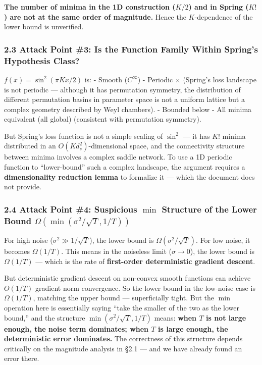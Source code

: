 \documentclass[
  12pt,
]{article}
\begin{document}
\textbf{The number of minima in the 1D construction ($K/2$) and in Spring ($K!$) are not at the same order of magnitude.} Hence the $K$-dependence of the lower bound is unverified.

\subsubsection{2.3 Attack Point \#3: Is the Function Family Within Spring's Hypothesis Class?}\label{attack-3-function-family}

$f(x) = \sin^2(\pi K x / 2)$ is:
- Smooth ($C^\infty$) \checkmark
- Periodic $\times$ (Spring's loss landscape is not periodic --- although it has permutation symmetry, the distribution of different permutation basins in parameter space is not a uniform lattice but a complex geometry described by Weyl chambers).
- Bounded below \checkmark
- All minima equivalent (all global) \checkmark (consistent with permutation symmetry).

But Spring's loss function is not a simple scaling of $\sin^2$ --- it has $K!$ minima distributed in an $O(K d_s^2)$-dimensional space, and the connectivity structure between minima involves a complex saddle network. To use a 1D periodic function to ``lower-bound'' such a complex landscape, the argument requires a \textbf{dimensionality reduction lemma} to formalize it --- which the document does not provide.

\subsubsection{2.4 Attack Point \#4: Suspicious $\min$ Structure of the Lower Bound $\Omega(\min(\sigma^2/\sqrt{T}, 1/T))$}\label{attack-4-min-structure}

For high noise ($\sigma^2 \gg 1/\sqrt{T}$), the lower bound is $\Omega(\sigma^2/\sqrt{T})$. For low noise, it becomes $\Omega(1/T)$. This means in the noiseless limit ($\sigma \to 0$), the lower bound is $\Omega(1/T)$ --- which is the rate of \textbf{first-order deterministic gradient descent}.

But deterministic gradient descent on non-convex smooth functions can achieve $O(1/T)$ gradient norm convergence. So the lower bound in the low-noise case is $\Omega(1/T)$, matching the upper bound --- superficially tight. But the $\min$ operation here is essentially saying ``take the smaller of the two as the lower bound,'' and the structure $\min(\sigma^2/\sqrt{T}, 1/T)$ means: \textbf{when $T$ is not large enough, the noise term dominates; when $T$ is large enough, the deterministic error dominates.} The correctness of this structure depends critically on the magnitude analysis in \S2.1 --- and we have already found an error there.
\end{document}
